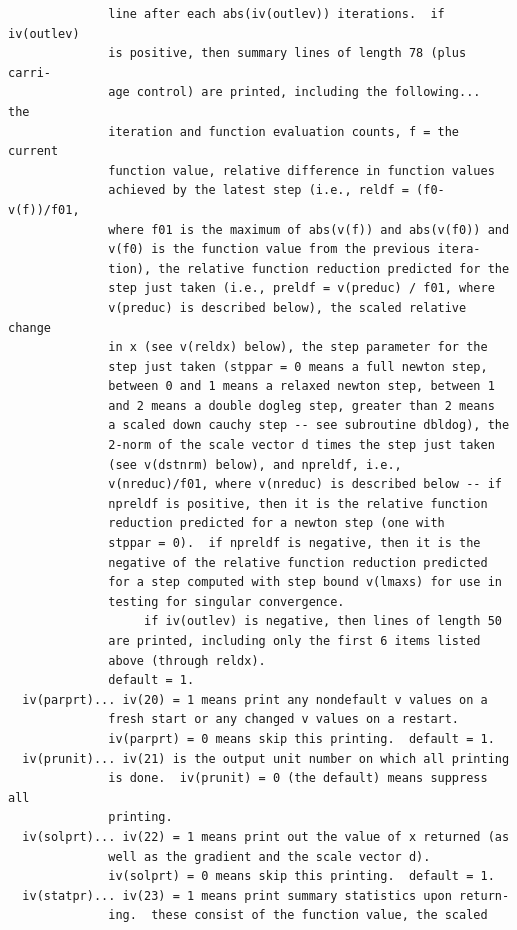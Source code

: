 \documentclass[11pt,twoside]{article}
\begin{document}
\begin{verbatim}
              line after each abs(iv(outlev)) iterations.  if iv(outlev)
              is positive, then summary lines of length 78 (plus carri-
              age control) are printed, including the following...  the
              iteration and function evaluation counts, f = the current
              function value, relative difference in function values
              achieved by the latest step (i.e., reldf = (f0-v(f))/f01,
              where f01 is the maximum of abs(v(f)) and abs(v(f0)) and
              v(f0) is the function value from the previous itera-
              tion), the relative function reduction predicted for the
              step just taken (i.e., preldf = v(preduc) / f01, where
              v(preduc) is described below), the scaled relative change
              in x (see v(reldx) below), the step parameter for the
              step just taken (stppar = 0 means a full newton step,
              between 0 and 1 means a relaxed newton step, between 1
              and 2 means a double dogleg step, greater than 2 means
              a scaled down cauchy step -- see subroutine dbldog), the
              2-norm of the scale vector d times the step just taken
              (see v(dstnrm) below), and npreldf, i.e.,
              v(nreduc)/f01, where v(nreduc) is described below -- if
              npreldf is positive, then it is the relative function
              reduction predicted for a newton step (one with
              stppar = 0).  if npreldf is negative, then it is the
              negative of the relative function reduction predicted
              for a step computed with step bound v(lmaxs) for use in
              testing for singular convergence.
                   if iv(outlev) is negative, then lines of length 50
              are printed, including only the first 6 items listed
              above (through reldx).
              default = 1.
  iv(parprt)... iv(20) = 1 means print any nondefault v values on a
              fresh start or any changed v values on a restart.
              iv(parprt) = 0 means skip this printing.  default = 1.
  iv(prunit)... iv(21) is the output unit number on which all printing
              is done.  iv(prunit) = 0 (the default) means suppress all
              printing.
  iv(solprt)... iv(22) = 1 means print out the value of x returned (as
              well as the gradient and the scale vector d).
              iv(solprt) = 0 means skip this printing.  default = 1.
  iv(statpr)... iv(23) = 1 means print summary statistics upon return-
              ing.  these consist of the function value, the scaled

\end{verbatim}
\end{document}
